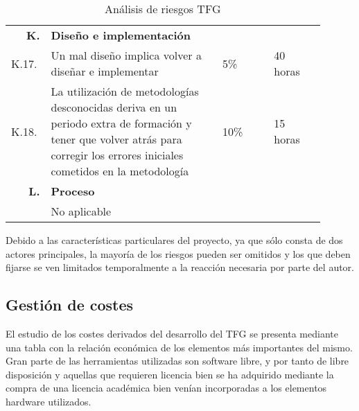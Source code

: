 \begin{table}[H]
\begin{tabular}{p{0.1\linewidth}p{0.5\linewidth}p{0.15\linewidth}p{0.15\linewidth}}
		\multicolumn{1}{r}{\cellcolor{black!30}\textbf{K. }} &
		\multicolumn{3}{l}{\cellcolor{black!30}\textbf{Diseño e implementación}}\\
		K.17. &Un mal diseño implica volver a diseñar e implementar							&	5\%		&	40 horas\\
		K.18. &La utilización de metodologías desconocidas deriva en un periodo extra de formación y tener que volver atrás para corregir los errores iniciales cometidos en la metodología										&	10\%	&	15 horas\\
		
		\multicolumn{1}{r}{\cellcolor{black!30}\textbf{L. }} &
		\multicolumn{3}{l}{\cellcolor{black!30}\textbf{Proceso}}\\	
		&No aplicable&&\\
	    \hline
	  \end{tabular}
	  \caption{Análisis de riesgos \ac{TFG}}
	  \label{tab:riesgos}
	\end{table}
	
	Debido a las características particulares del proyecto, ya que sólo consta de dos actores principales, la mayoría de los riesgos pueden ser omitidos y los que deben fijarse se ven limitados temporalmente a la reacción necesaria por parte del autor.
	
	\subsection{Gestión de costes}
	El estudio de los costes derivados del desarrollo del \ac{TFG} se presenta mediante una tabla con la relación económica de los elementos más importantes del mismo. Gran parte de las herramientas utilizadas son software libre, y por tanto de libre disposición y aquellas que requieren licencia bien se ha adquirido mediante la compra de una licencia académica bien venían incorporadas a los elementos hardware utilizados. 
	

